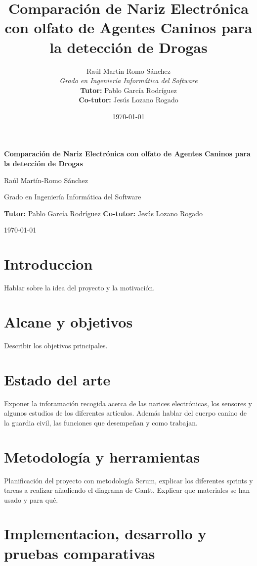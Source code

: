 \documentclass[12pt,a4paper,oneside]{report}
\title{Comparación de Nariz Electrónica con olfato de Agentes Caninos para la detección de Drogas}
\author{Raúl Martín-Romo Sánchez\\
	\textit{Grado en Ingeniería Informática del Software}\\
	\textbf{Tutor:} Pablo García Rodríguez\\
    \textbf{Co-tutor:} Jesús Lozano Rogado}
\date{\today}
\begin{document}
\begingroup
\begin{center}
	{\LARGE \textbf{Comparación de Nariz Electrónica con olfato de Agentes Caninos para la detección de Drogas}\par}
	\vspace{1em}
	{\large Raúl Martín-Romo Sánchez\par}
	{\small Grado en Ingeniería Informática del Software\par}
	\vspace{0.5em}
	{\small \textbf{Tutor:} Pablo García Rodríguez \quad \textbf{Co-tutor:} Jesús Lozano Rogado\par}
	\vspace{1em}
	{\small \today\par}
\end{center}
\bigskip
\endgroup

\section{Introduccion}
Hablar sobre la idea del proyecto y la motivación.

\section{Alcane y objetivos}
Describir los objetivos principales.

\section{Estado del arte}
Exponer la inforamación recogida acerca de las narices electrónicas, los sensores y algunos estudios de los diferentes artículos. Además hablar del cuerpo canino de la guardia civil, las funciones que desempeñan y como trabajan.

\section{Metodología y herramientas}
Planificación del proyecto con metodología Scrum, explicar los diferentes sprints y tareas a realizar añadiendo el diagrama de Gantt.
Explicar que materiales se han usado y para qué.

\section{Implementacion, desarrollo y pruebas comparativas}
\end{document}
